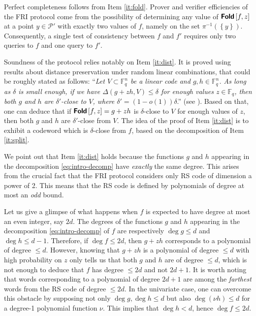 \documentclass[10pt,a4paper]{article}
\newcommand\Fq{\mathbb{F}_q}
\newcommand\fold[1]{\textsf{\textbf{Fold}}\left[#1\right]}
\newcommand{\set}[1]{\left\{#1\right\}}
\newcommand\calP{\mathcal{P}}
\theoremstyle{plain}
\theoremstyle{plain}
\theoremstyle{definition}
\theoremstyle{remark}
\theoremstyle{plain}
\begin{document}
Perfect completeness follows from Item \ref{it:fold}. Prover and verifier efficiencies of the \textsf{FRI} protocol come from the possibility of determining any value of $\fold{f,z}$ at a point $y \in \calP'$ with exactly two values of $f$, namely on the set $\pi^{-1}(\set{y})$. Consequently, a single test of consistency between $f$ and $f'$ requires only two queries to $f$ and one query to $f'$.

Soundness of the protocol relies notably on Item \ref{it:dist}. It is proved using results about distance preservation under random linear combinations, that could be roughly stated as follows:
``\emph{Let $V \subset \Fq^{n}$ be a linear code and $g, h \in \Fq^n$. As long as $\delta$ is small enough, if we have $\Delta(g + z h, V) \le \delta$ for enough values $z \in \Fq$, then both $g$ and $h$ are $\delta'$-close to $V$, where $\delta' = (1 - o(1))\delta$}.'' (see \cite{BBHR18a, BKS18, BGKS20, BCIKS20}). Based on that, one can deduce that if $\fold{f, z} = g + zh$ is $\delta$-close to $V$ for enough values of $z$, then both $g$ and $h$ are $\delta'$-close from $V$. The idea of the proof of Item \ref{it:dist} is to exhibit a codeword which is $\delta$-close from $f$, based on the decomposition of Item \ref{it:split}. 

\begin{remark}\label{rmk:even-RS}
	We point out that Item \ref{it:dist} holds because the functions $g$ and $h$ appearing in the decomposition \eqref{eq:intro-decomp} have \emph{exactly} the same degree. This arises from the crucial fact that the \textsf{FRI} protocol considers only RS code of dimension a power of 2. This means that the RS code is defined by polynomials of degree at most an \emph{odd} bound.
	
	Let us give a glimpse of what happens when $f$ is expected to have degree at most an even integer, say $2d$. The degrees of the functions $g$ and $h$ appearing in the decomposition \eqref{eq:intro-decomp} of $f$ are respectively $\deg g \le d$ and $\deg h \le d-1$. 
	Therefore, if $\deg f \le 2d$, then $g + z h$ corresponds to a polynomial of degree $\le d$. However, knowing that $g + z h$ is a polynomial of degree $\le d$ with high probability on $z$ only tells us that both $g$ and $h$ are of degree $\le d$, which is not enough to deduce that $f$ has degree $\le 2d$ and not $2d + 1$. 
	It is worth noting that words corresponding to a polynomial of degree $2d+1$ are among the \emph{farthest} words from the RS code of degree $\le 2d$.       
	In the univariate case, one can overcome this obstacle by supposing not only $\deg g,\deg h \leq d$ but also $\deg (\nu h) \le d$ for a degree-1 polynomial function $\nu$. This implies that $\deg h < d$, hence $\deg f \leq 2d$.
\end{remark}
\end{document}
